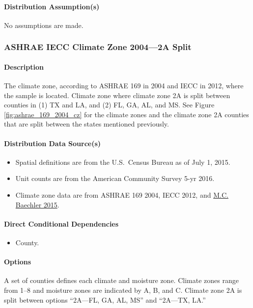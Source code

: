 \paragraph{Distribution Assumption(s)}
No assumptions are made.

\subsubsection{ASHRAE IECC Climate Zone 2004---2A Split}
\paragraph{Description}
The climate zone, according to ASHRAE 169 in 2004 and IECC in 2012, where the sample is located. Climate zone where climate zone 2A is split between counties in (1) TX and LA, and (2) FL, GA, AL, and MS. See Figure \ref{fig:ashrae_169_2004_cz} for the climate zones and the climate zone 2A counties that are split between the states mentioned previously.

\paragraph{Distribution Data Source(s)}
\begin{itemize}
    \item Spatial definitions are from the U.S.~Census Bureau as of July 1, 2015.
    \item Unit counts are from the American Community Survey 5-yr 2016.
    \item Climate zone data are from ASHRAE 169 2004, IECC 2012, and \href{https://www.energy.gov/sites/prod/files/2015/10/f27/ba_climate_region_guide_7.3.pdf}{M.C. Baechler 2015}.
\end{itemize}

\paragraph{Direct Conditional Dependencies}
\begin{itemize}
    \item County.
\end{itemize}

\paragraph{Options}
A set of counties defines each climate and moisture zone. Climate zones range from 1--8 and moisture zones are indicated by A, B, and C. Climate zone 2A is split between options ``2A---FL, GA, AL, MS'' and ``2A---TX, LA.''

